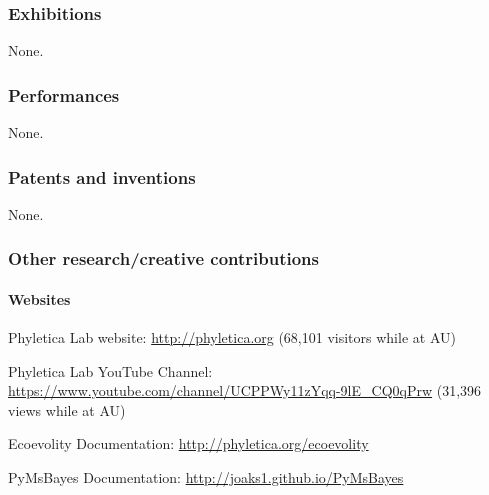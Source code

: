 

\subsubsection{Exhibitions}
None.

\subsubsection{Performances}
None.

\subsubsection{Patents and inventions}
None.

\subsubsection{Other research/creative contributions}
 
\paragraph{Websites}
\begin{tightItemize}
    \item Phyletica Lab website: \url{http://phyletica.org} (68,101 visitors while at AU)
    \item Phyletica Lab YouTube Channel: \url{https://www.youtube.com/channel/UCPPWy11zYqq-9lE_CQ0qPrw} (31,396 views while at AU)
    \item Ecoevolity Documentation: \url{http://phyletica.org/ecoevolity}
    \item PyMsBayes Documentation: \url{http://joaks1.github.io/PyMsBayes}
\end{tightItemize}

